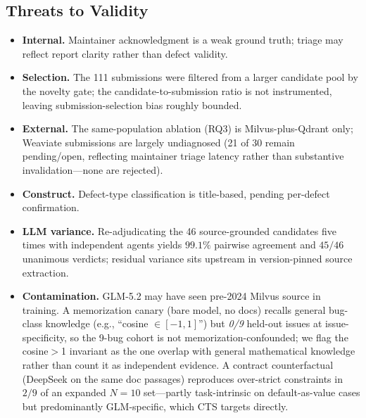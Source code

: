 \documentclass[sigconf]{acmart}
\begin{document}
\subsection{Threats to Validity}
\begin{itemize}[leftmargin=*,itemsep=2pt]
\item \textbf{Internal.} Maintainer acknowledgment is a weak ground truth; triage may reflect report clarity rather than defect validity.
\item \textbf{Selection.} The 111 submissions were filtered from a larger candidate pool by the novelty gate; the candidate-to-submission ratio is not instrumented, leaving submission-selection bias roughly bounded.
\item \textbf{External.} The same-population ablation (RQ3) is Milvus-plus-Qdrant only; Weaviate submissions are largely undiagnosed (21 of 30 remain pending/open, reflecting maintainer triage latency rather than substantive invalidation---none are rejected).
\item \textbf{Construct.} Defect-type classification is title-based, pending per-defect confirmation.
\item \textbf{LLM variance.} Re-adjudicating the 46 source-grounded candidates five times with independent agents yields $99.1\%$ pairwise agreement and $45/46$ unanimous verdicts; residual variance sits upstream in version-pinned source extraction.
\item \textbf{Contamination.} GLM-5.2 may have seen pre-2024 Milvus source in training. A memorization canary (bare model, no docs) recalls general bug-class knowledge (e.g., ``cosine $\in [-1,1]$'') but \emph{0/9} held-out issues at issue-specificity, so the 9-bug cohort is not memorization-confounded; we flag the cosine$>$1 invariant as the one overlap with general mathematical knowledge rather than count it as independent evidence. A contract counterfactual (DeepSeek on the same doc passages) reproduces over-strict constraints in $2/9$ of an expanded $N{=}10$ set---partly task-intrinsic on default-as-value cases but predominantly GLM-specific, which CTS targets directly.

\end{itemize}
\end{document}
